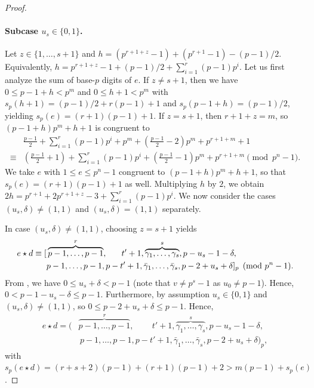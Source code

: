 \documentclass[12pt]{article}
\newcommand{\comp}[1]{\bar{#1}}
\newcommand{\wt}{s_p}
\begin{document}
\begin{proof}
\paragraph{Subcase $u_s \in \{0, 1\}$.} Let $z \in \{1,\dots,s+1\}$ and $h = (p^{r + 1 + z} - 1) + (p^{r + 1} - 1) - (p - 1)/2$. Equivalently, $h = p^{r + 1 + z} - 1 + (p - 1)/2 + \sum_{i = 1}^r (p - 1)p^i$.
Let us first analyze the sum of base-$p$ digits of $e$. If $z \neq s+1$, then we have $0 \leq p-1+h <p^m$ and $0 \leq h+1 < p^m$ with $\wt(h+1) = (p-1)/2 + r(p-1) + 1$ and $\wt(p-1+h) = (p - 1)/2$, yielding $\wt(e) = (r+1)(p-1) +1$. If $z = s+1$, then $r+1+z = m$, so $(p-1+h)p^m + h+1$ is congruent to
\begin{align*}
&\frac{p-1}{2} + \sum_{i=1}^r(p-1)p^i + p^m + \left(\frac{p-1}{2}-2\right)p^m + p^{r+1+m} + 1 \\
\equiv &\left(\frac{p-1}{2}+1\right) + \sum_{i=1}^r(p-1)p^i + \left(\frac{p-1}{2}-1\right)p^m + p^{r+1+m} \pmod{p^n - 1}.
\end{align*}
We take $e$ with $1 \leq e \leq p^n-1$ congruent to $(p-1+h)p^m + h+1$, so that
$\wt(e) = (r+1)(p-1) + 1$ as well. 
Multiplying $h$ by $2$, we obtain $2h = p^{r+1} + 2p^{r+1+z} -3 + \sum_{i=1}^r(p-1)p^i$.
We now consider the cases $(u_s,\delta) \neq (1,1)$  and $(u_s,\delta) = (1,1)$ separately.

In case $(u_s,\delta) \neq (1,1)$, choosing $z = s+1$ yields
\begin{align*}
e \star d \equiv [&\overbrace{p-1,\dots,p-1}^r,\hphantom{p-}\;\,t'+1,\overbrace{\gamma_1,\dots,\gamma_s}^s, p-u_s-1-\delta,\\ &p-1,\dots,p-1,p-t'+1, \comp{\gamma}_1,\dots,\comp{\gamma}_s,p-2+u_s+\delta]_p \pmod {p^n-1}. 
\end{align*}
From , we have $0 \le u_s + \delta < p - 1$ (note that $v \neq p^s - 1$ as $u_0 \neq p - 1$). Hence, $0 < p - 1 - u_s - \delta \le p - 1$.
Furthermore, by assumption $u_s \in \{0, 1\}$ and $(u_s, \delta) \neq (1, 1)$, so $0 \le p - 2 + u_s + \delta \le p - 1$. Hence,
\begin{align*}
e \star d = (&\overbrace{p-1,\dots,p-1}^r,\phantom{p-}\;\, t'+1,\overbrace{\gamma_1,\dots,\gamma_s}^s, p-u_s-1-\delta,\\ &\,p-1,\dots,p-1,p-t'+1, \comp{\gamma}_1,\dots,\comp{\gamma}_s,p-2+u_s+\delta)_p,
\end{align*}
with $\wt(e \star d) = (r+s+2)(p-1)+ (r+1)(p-1) + 2 > m(p - 1)+ \wt(e)$.


\end{proof}
\end{document}
